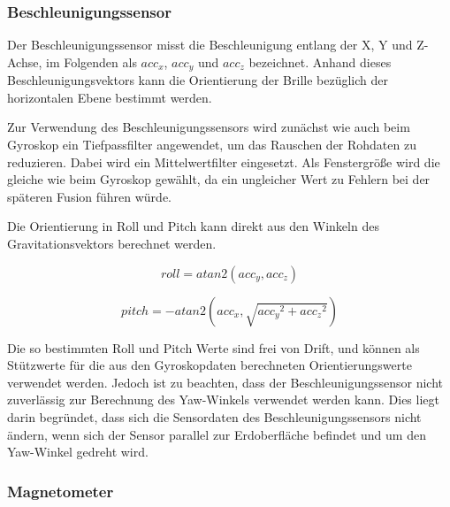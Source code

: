 

\subsubsection{Beschleunigungssensor}


Der Beschleunigungssensor misst die Beschleunigung entlang der X, Y und Z-Achse, im Folgenden als $acc_x$, $acc_y$ und $acc_z$ bezeichnet.
Anhand dieses Beschleunigungsvektors kann die Orientierung der Brille bezüglich der horizontalen Ebene bestimmt werden.

Zur Verwendung des Beschleunigungssensors wird zunächst wie auch beim
Gyroskop ein Tiefpassfilter angewendet, um das Rauschen der Rohdaten zu
reduzieren.
Dabei wird ein Mittelwertfilter eingesetzt.
Als Fenstergröße wird die gleiche wie beim Gyroskop gewählt, da ein ungleicher Wert zu Fehlern bei der späteren Fusion
führen würde. 


Die Orientierung in Roll und Pitch kann direkt aus den Winkeln des Gravitationsvektors berechnet werden.

\begin{equation}
    roll = atan2(acc_y, acc_z)
\end{equation}

\begin{equation}
    pitch = -atan2(acc_x, \sqrt{ {acc_y}^2 + {acc_z}^2 })
\end{equation}

Die so bestimmten Roll und Pitch Werte sind frei von Drift, und können als Stützwerte für die aus den Gyroskopdaten berechneten Orientierungswerte verwendet werden.
Jedoch ist zu beachten, dass der Beschleunigungssensor nicht zuverlässig zur Berechnung des Yaw-Winkels verwendet werden kann.
Dies liegt darin begründet, dass sich die Sensordaten des Beschleunigungssensors nicht ändern, wenn sich der Sensor parallel zur Erdoberfläche befindet und um den Yaw-Winkel gedreht wird.





\subsubsection{Magnetometer}
\label{headtracking_magnetometer_subsubsec}

